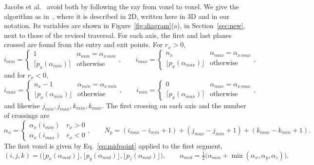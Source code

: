 \documentclass[11pt,a4paper]{article}
\theoremstyle{remark}
\begin{document}
Jacobs et al.~\cite{jacobs1998fast} avoid both by following the ray from voxel to voxel. We give the
algorithm as in~\cite{biguri2017}, where it is described in 2D, written here in 3D and in our notation.
Its variables are shown in Figure~\ref{fig:diagram}(a), in Section~\ref{sec:new}, next to those of the
revised traversal. For each axis, the first and last planes crossed are
found from the entry and exit points. For $r_x>0$,
\begin{equation}
i_{min}=\begin{cases}1 & \alpha_{min}=\alpha_{x\,min}\\ \lceil p_x(\alpha_{min})\rceil & \text{otherwise}\end{cases},
\qquad
i_{max}=\begin{cases}n_x & \alpha_{max}=\alpha_{x\,max}\\ \lfloor p_x(\alpha_{max})\rfloor & \text{otherwise}\end{cases},
\label{eq:limpos}
\end{equation}
and for $r_x<0$,
\begin{equation}
i_{max}=\begin{cases}n_x-1 & \alpha_{min}=\alpha_{x\,min}\\ \lfloor p_x(\alpha_{min})\rfloor & \text{otherwise}\end{cases},
\qquad
i_{min}=\begin{cases}0 & \alpha_{max}=\alpha_{x\,max}\\ \lceil p_x(\alpha_{max})\rceil & \text{otherwise}\end{cases},
\label{eq:limneg}
\end{equation}
and likewise $j_{min},j_{max},k_{min},k_{max}$. The first crossing on each axis and the number of crossings
are
\begin{equation}
\alpha_x=\begin{cases}\alpha_x(i_{min}) & r_x>0\\ \alpha_x(i_{max}) & r_x<0\end{cases},\qquad
N_p=(i_{max}-i_{min}+1)+(j_{max}-j_{min}+1)+(k_{max}-k_{min}+1). \label{eq:first}
\end{equation}
The first voxel is given by Eq.~\eqref{eq:midpoint} applied to the first segment,
\begin{equation}
(i,j,k)=\big(\lfloor p_x(\alpha_{mid})\rfloor,\lfloor p_y(\alpha_{mid})\rfloor,\lfloor p_z(\alpha_{mid})\rfloor\big),
\qquad \alpha_{mid}=\tfrac12\big(\alpha_{min}+\min(\alpha_x,\alpha_y,\alpha_z)\big). \label{eq:jstart}
\end{equation}
\end{document}
